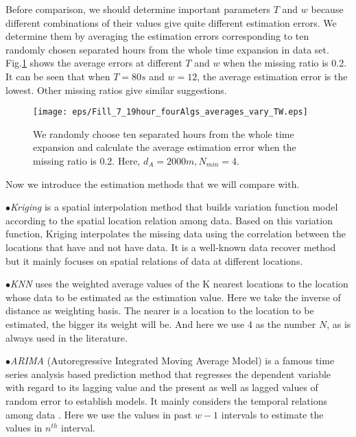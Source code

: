 \documentclass[twocolumn,10pt,final,conference]{IEEEtran}
\begin{document}
Before comparison, we should determine important parameters $T$ and $w$ because different combinations of their values give quite different estimation errors. We determine them by averaging the estimation errors corresponding to ten randomly chosen separated hours from the whole time expansion in data set. Fig.\ref{fig-fill-difft-w-STC} shows the average errors at different $T$ and $w$ when the missing ratio is 0.2. It can be seen that when $T=80s$ and $w=12$, the average estimation error is the lowest. Other missing ratios give similar suggestions.

\begin{figure}[h]
  \centering
  \texttt{[image: eps/Fill\_7\_19hour\_fourAlgs\_averages\_vary\_TW.eps]}\\
  \caption{We randomly choose ten separated hours from the whole time expansion and calculate the average estimation error when the missing ratio is 0.2. Here, $d_A=2000m, N_{min}=4$.}
  \label{fig-fill-difft-w-STC}
\end{figure}
Now we introduce the estimation methods that we will compare with.

$\bullet$\emph{Kriging} is a spatial interpolation method that builds variation function model according to the spatial location relation among data\cite{Ref82}\cite{Ref90}. Based on this variation function, Kriging interpolates the missing data using the correlation between the locations that have and not have data. It is a well-known data recover method but it mainly focuses on spatial relations of data at different locations.

$\bullet$\emph{KNN} uses the weighted average values of the K nearest locations to the location whose data to be estimated as the estimation value. Here we take the inverse of distance as weighting basis. The nearer is a location to the location to be estimated, the bigger its weight will be. And here we use 4 as the number $N$, as is always used in the literature.

$\bullet$\emph{ARIMA} (Autoregressive Integrated Moving Average Model) is a famous time series analysis based prediction method that regresses the dependent variable with regard to its lagging value and the present as well as lagged values of random error to establish models. It mainly considers the temporal relations among data \cite{Ref83}. Here we use the values in past $w-1$ intervals to estimate the values in $n^{th}$ interval.
\end{document}
